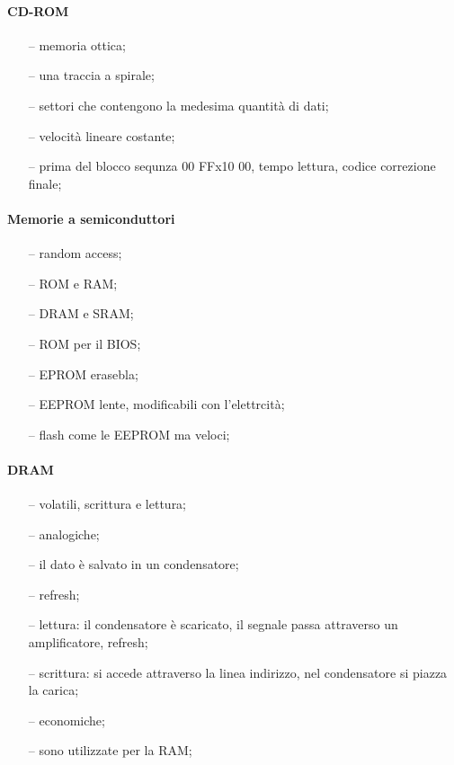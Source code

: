 \documentclass{article}
\begin{document}
\paragraph{CD-ROM}
\begin{itemize}
	\item[--] memoria ottica;
	\item[--] una traccia a spirale;
	\item[--] settori che contengono la medesima quantità di dati;
	\item[--] velocità lineare costante;
	\item[--] prima del blocco sequnza 00 FFx10 00, tempo lettura, codice correzione finale;
\end{itemize}

\paragraph{Memorie a semiconduttori}
\begin{itemize}
 \item[--] random access;
 \item[--] ROM e RAM;
 \item[--] DRAM e SRAM;
 \item[--] ROM per il BIOS;
 \item[--] EPROM erasebla;
 \item[--] EEPROM lente, modificabili con l'elettrcità;
 \item[--] flash come le EEPROM ma veloci;
\end{itemize}

\paragraph{DRAM}
\begin{itemize}
	\item[--] volatili, scrittura e lettura;
	\item[--] analogiche;
	\item[--] il dato è salvato in un condensatore;
	\item[--] refresh;
	\item[--] lettura: il condensatore è scaricato, il segnale passa attraverso un amplificatore, refresh;
	\item[--] scrittura: si accede attraverso la linea indirizzo, nel condensatore si piazza la carica;
  \item[--] economiche;
	\item[--] sono utilizzate per la RAM;
\end{itemize}
\end{document}

